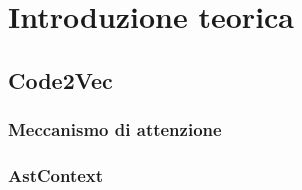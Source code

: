 \chapter{Introduzione teorica}\label{chap:introduzione_teorica}

\section{Code2Vec}\label{sec:code2vec}

\subsection{Meccanismo di attenzione}

\subsection{AstContext}\label{subsec:astcontext}